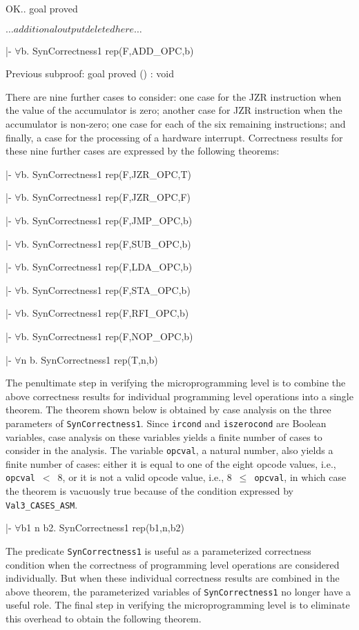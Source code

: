 \begintt
OK..
goal proved

\( \ldots additional output deleted here \ldots \)

|- \(\forall\)b. SynCorrectness1 rep(F,ADD_OPC,b)

Previous subproof:
goal proved
() : void
\endtt

There are nine further cases to consider:
one case for the JZR instruction when the value of the accumulator
is zero; another case for JZR instruction when the accumulator is
non-zero;
one case for each of the six remaining instructions;
and finally, a case for the processing of a hardware interrupt.
Correctness results for these nine further cases are expressed
by the following theorems:

\begintt
|- \(\forall\)b. SynCorrectness1 rep(F,JZR_OPC,T)

|- \(\forall\)b. SynCorrectness1 rep(F,JZR_OPC,F)

|- \(\forall\)b. SynCorrectness1 rep(F,JMP_OPC,b)

|- \(\forall\)b. SynCorrectness1 rep(F,SUB_OPC,b)

|- \(\forall\)b. SynCorrectness1 rep(F,LDA_OPC,b)

|- \(\forall\)b. SynCorrectness1 rep(F,STA_OPC,b)

|- \(\forall\)b. SynCorrectness1 rep(F,RFI_OPC,b)

|- \(\forall\)b. SynCorrectness1 rep(F,NOP_OPC,b)

|- \(\forall\)n b. SynCorrectness1 rep(T,n,b)
\endtt

The penultimate step in verifying the microprogramming level is to combine
the above correctness results for individual programming level operations
into a single theorem.
The theorem shown below is obtained by case analysis on the
three parameters of \verb"SynCorrectness1".
Since \verb"ircond" and \verb"iszerocond" are Boolean variables,
case analysis on these variables yields a finite number of cases
to consider in the analysis.
The variable \verb"opcval", a natural number, also yields
a finite number of cases: either it is equal to one of the
eight opcode values, i.e., \mbox{\verb"opcval" $<$ 8},
or it is not a valid opcode value,
i.e., \mbox{8 $\leq$ \verb"opcval"}, in which case the theorem
is vacuously true because of the condition expressed by
\verb"Val3_CASES_ASM".

\begintt
|- \(\forall\)b1 n b2. SynCorrectness1 rep(b1,n,b2)
\endtt

The predicate \verb"SynCorrectness1" is useful
as a parameterized correctness condition when the correctness
of programming level operations are considered individually.
But when these individual correctness results
are combined in the above theorem,
the parameterized variables of \verb"SynCorrectness1"
no longer have a useful role.
The final step in verifying the microprogramming level
is to eliminate this overhead to obtain the following theorem.

